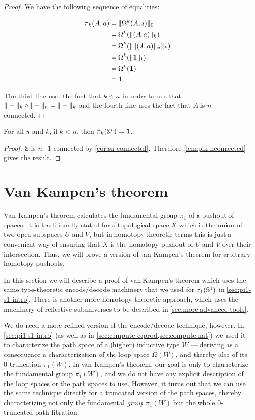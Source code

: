 \begin{proof}
  We have the following sequence of equalities:

  \begin{align*}
    \pi_k(A,a) &= \trunc0{\Omega^k(A,a)} \\
    &= \Omega^k(\trunc k{(A,a)}) \\
    &= \Omega^k(\trunc k{\trunc n{(A,a)}}) \\
    &= \Omega^k(\trunc k{\unit}) \\
    &= \Omega^k(\unit) \\
    &= \unit
  \end{align*}

  The third line uses the fact that $k\le{}n$ in order to use that
  $\truncf k\circ\truncf n=\truncf k$ and the fourth line uses the fact that $A$ is
  $n$-connected.
\end{proof}

\begin{cor}[$\pi_{k<n}(\Sn ^n)$]
For all $n$ and $k$, if $k < n$, then $\pi_k(\Sn ^n) = \unit$.  
\end{cor}
\begin{proof}
$\Sn$ is $n\mathord{-}1$-connected by \autoref{cor:sn-connected}.  Therefore
\autoref{lem:pik-nconnected} gives the result.  
\end{proof}

\section{Van Kampen's theorem}
\label{sec:van-kampen}

Van Kampen's theorem calculates the fundamental group $\pi_1$ of a pushout of spaces.
It is traditionally stated for a topological space $X$ which is the union of two open subspaces $U$ and $V$, but in homotopy-theoretic terms this is just a convenient way of ensuring that $X$ is the homotopy pushout of $U$ and $V$ over their intersection.
Thus, we will prove a version of van Kampen's theorem for arbitrary homotopy pushouts.

In this section we will describe a proof of van Kampen's theorem which uses the same type-theoretic encode/decode machinery that we used for $\pi_1(\Sn^1)$ in \autoref{sec:pi1-s1-intro}.
There is another more homotopy-theoretic approach, which uses the machinery of reflective subuniverses to be described in \autoref{sec:more-advanced-tools}.

We do need a more refined version of the encode/decode technique, however.
In \autoref{sec:pi1-s1-intro} (as well as in \autoref{sec:compute-coprod,sec:compute-nat}) we used it to characterize the path space of a (higher) inductive type $W$ --- deriving as a consequence a characterization of the loop space $\Omega(W)$, and thereby also of its 0-truncation $\pi_1(W)$.
In van Kampen's theorem, our goal is only to characterize the fundamental group $\pi_1(W)$, and we do not have any explicit description of the loop spaces or the path spaces to use.
However, it turns out that we can use the same technique directly for a truncated version of the path spaces, thereby characterizing not only the fundamental \emph{group} $\pi_1(W)$ but the whole 0-truncated path fibration.


